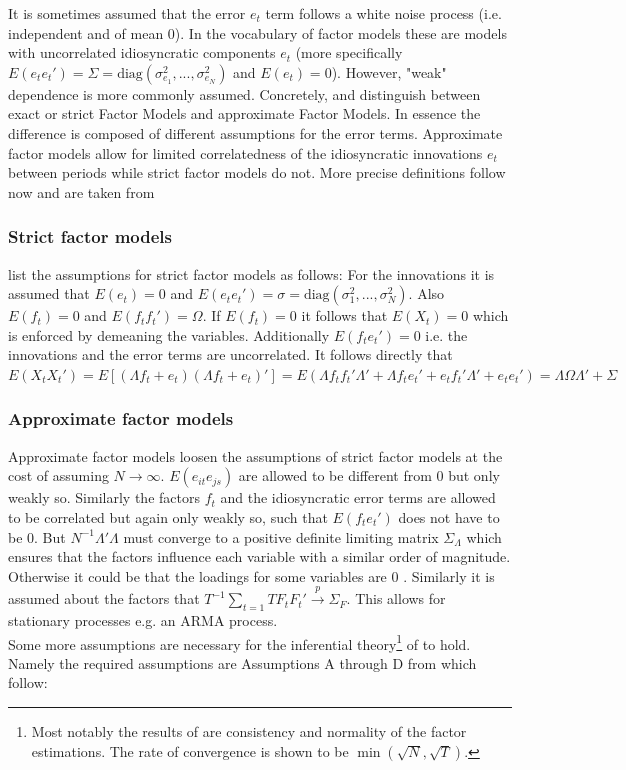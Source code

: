 \documentclass[12pt]{article}
\begin{document}
It is sometimes assumed that the error $e_t$ term follows a white noise process (i.e. independent and of mean 0). In the vocabulary of factor models these are models with uncorrelated idiosyncratic components $e_t$ (more specifically $E(e_t e_t') = \Sigma = \text{diag}(\sigma_{e_1}^2, ..., \sigma_{e_N}^2)$ and $E(e_t) = 0$).
However, "weak" dependence is more commonly assumed. Concretely, \citet{geweke1977dynamic} and \citet{sargent1977business} distinguish between exact or strict Factor Models and approximate Factor Models. In essence the difference is composed of different assumptions for the error terms. Approximate factor models allow for limited correlatedness of the idiosyncratic innovations $e_t$ between periods while strict factor models do not. More precise definitions follow now and are taken from \citet{breitung2006dynamic}
\subsubsection*{Strict factor models}
\citet{breitung2006dynamic} list the assumptions for strict factor models as follows: For the innovations it is assumed that $E(e_t) = 0$ and $E(e_te_t') = \sigma = \text{diag}(\sigma_1^2, ..., \sigma_N^2)$. Also $E(f_t) = 0$ and $E(f_tf_t') = \Omega$. If $E(f_t) = 0$ it follows that $E(X_t) = 0$ which is enforced by demeaning the variables. Additionally $E(f_t e_t') = 0$ i.e. the innovations and the error terms are uncorrelated. It follows directly that $E(X_tX_t') = E[(\Lambda f_t +e_t) (\Lambda f_t + e_t)'] = E(\Lambda f_t f_t' \Lambda' + \Lambda f_t e_t' + e_t f_t' \Lambda' + e_t e_t') = \Lambda \Omega \Lambda' + \Sigma$ 
\subsubsection*{Approximate factor models}
Approximate factor models loosen the assumptions of strict factor models at the cost of assuming $N \to \infty$.
$E(e_{it}e_{js})$ are allowed to be different from $0$ but only weakly so. Similarly the factors $f_t$ and  the idiosyncratic error terms are allowed to be correlated but again only weakly so, such that $E(f_t e_t')$ does not have to be $0$. But $N^{-1}\Lambda'\Lambda$ must converge to a positive definite limiting matrix $\Sigma_\Lambda$ which ensures that the factors influence each variable with a similar order of magnitude. Otherwise it could be that the loadings for some variables are $0$ \citep{breitung2006dynamic}. Similarly it is assumed about the factors that $T^{-1}\sum_{t=1}TF_tF_t' \overset{p}{\to} \Sigma_F$. This allows for stationary processes e.g. an ARMA process. \\
Some more assumptions are necessary for the inferential theory\footnote{Most notably the results of \citet{bai2003inferential} are consistency and normality of the factor estimations. The rate of convergence is shown to be $\min(\sqrt{N}, \sqrt{T})$.} of \citet{bai2003inferential} to hold. Namely the required assumptions are Assumptions A through D from \citet{bai2003inferential} which follow:
\end{document}
